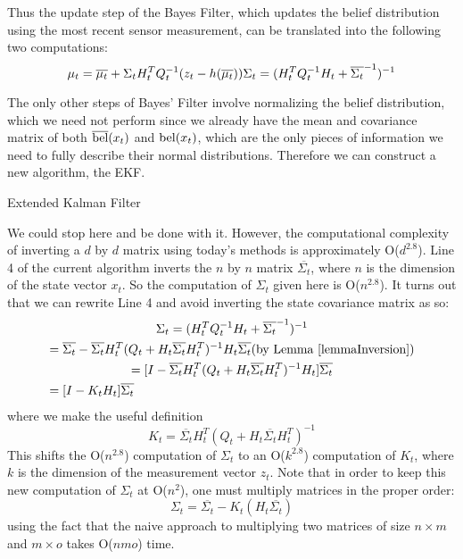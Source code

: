 Thus the update step of the Bayes Filter, which updates the belief distribution using the most recent sensor measurement, can be translated into the following two computations:
\[
\mu_t = \overline{\mu_t} + \Sigma_t H_t^TQ_t^{-1}(z_t - h(\overline{\mu_t})) \\
\Sigma_t = (H_t^T Q_t^{-1} H_t + \overline{\Sigma_t}^{-1})^{-1}
\]

The only other steps of Bayes' Filter involve normalizing the belief distribution, which we need not perform since we already have the mean and covariance matrix of both \(\overline{\mathrm{bel}}(x_t)\) and \(\mathrm{bel}(x_t)\), which are the only pieces of information we need to fully describe their normal distributions. Therefore we can construct a new algorithm, the EKF.
\begin{algorithm} 
	\caption{Extended Kalman Filter}
	\label{alg:EKFnonOptimal}
	\begin{algorithmic}[1]
		\State {}
		\EndFunction
	\end{algorithmic}
\end{algorithm}

We could stop here and be done with it. However, the computational complexity of inverting a \(d\) by \(d\) matrix using today's methods is approximately O(\(d^{2.8}\)). Line 4 of the current algorithm inverts the \(n\) by \(n\) matrix \(\overline{\Sigma_t}\), where \(n\) is the dimension of the state vector \(x_t\). So the computation of \(\Sigma_t\) given here is O(\(n^{2.8}\)). It turns out that we can rewrite Line 4 and avoid inverting the state covariance matrix as so:
\begin{multline*}
\Sigma_t = (H_t^T Q_t^{-1} H_t + \overline{\Sigma_t}^{-1})^{-1} \\
= \overline{\Sigma_t} - \overline{\Sigma_t} H_t^T (Q_t + H_t \overline{\Sigma_t} H_t^T)^{-1} H_t \overline{\Sigma_t} \hfill \text{(by Lemma \ref{lemmaInversion})} \\
= [ I - \overline{\Sigma_t} H_t^T (Q_t + H_t \overline{\Sigma_t} H_t^T)^{-1} H_t ] \overline{\Sigma_t} \\
= [I - K_t H_t] \overline{\Sigma_t} \hfill
\end{multline*}
where we make the useful definition 
\[
K_t = \overline{\Sigma_t} H_t^T (Q_t + H_t \overline{\Sigma_t} H_t^T)^{-1}
\]
This shifts the O(\(n^{2.8}\)) computation of \(\Sigma_t\) to an O(\(k^{2.8}\)) computation of \(K_t\), where \(k\) is the dimension of the measurement vector \(z_t\). Note that in order to keep this new computation of \(\Sigma_t\) at O(\(n^2\)), one must multiply matrices in the proper order:
\[\Sigma_t = \overline{\Sigma_t} - K_t (H_t \overline{\Sigma_t})
\]
using the fact that the naive approach to multiplying two matrices of size \(n \times m\) and \(m \times o\) takes O(\(n m o\)) time.

